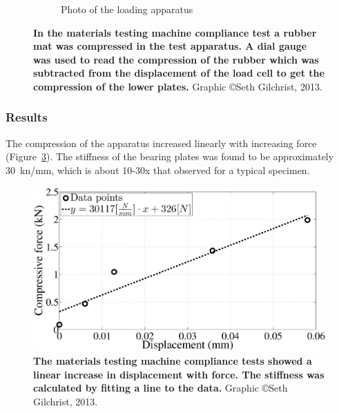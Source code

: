 \begin{figure}
\begin{subfigure}[b]{0.38\textwidth}
\caption{Photo of the loading apparatus}
\label{fig:instronCompPhoto}
\end{subfigure}
\caption[Materials testing machine compliance test]{\textbf{In the materials testing machine compliance test a rubber mat was compressed in the test apparatus. A dial gauge was used to read the compression of the rubber which was subtracted from the displacement of the load cell to get the compression of the lower plates.} Graphic \copyright Seth Gilchrist, 2013.}
\label{fig:InstronCompliance}
\end{figure}

\subsubsection{Results}
The compression of the apparatus increased linearly with increasing force (Figure~\ref{fig:insComp}).
The stiffness of the bearing plates was found to be approximately 30~\ac{kn}/\ac{mm}, which is about 10-30x that observed for a typical specimen.

\begin{figure}
\centering
\includegraphics[width=\linewidth]{./appendixSupport/Figures/insComp}
\caption[Materials testing machine compliance results]{\textbf{The materials testing machine compliance tests showed a linear increase in displacement with force. The stiffness was calculated by fitting a line to the data.} Graphic \copyright Seth Gilchrist, 2013.}
\label{fig:insComp}
\end{figure}

